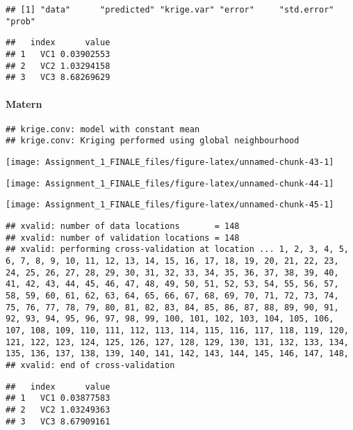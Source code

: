 \documentclass[
]{article}
\begin{document}
\begin{verbatim}
## [1] "data"      "predicted" "krige.var" "error"     "std.error" "prob"
\end{verbatim}

\begin{verbatim}
##   index      value
## 1   VC1 0.03902553
## 2   VC2 1.03294158
## 3   VC3 8.68269629
\end{verbatim}

\hypertarget{matern-1}{%
\paragraph{Matern}\label{matern-1}}

\begin{verbatim}
## krige.conv: model with constant mean
## krige.conv: Kriging performed using global neighbourhood
\end{verbatim}

\begin{center}\texttt{[image: Assignment\_1\_FINALE\_files/figure-latex/unnamed-chunk-43-1]} \end{center}

\begin{center}\texttt{[image: Assignment\_1\_FINALE\_files/figure-latex/unnamed-chunk-44-1]} \end{center}

\begin{center}\texttt{[image: Assignment\_1\_FINALE\_files/figure-latex/unnamed-chunk-45-1]} \end{center}

\begin{verbatim}
## xvalid: number of data locations       = 148
## xvalid: number of validation locations = 148
## xvalid: performing cross-validation at location ... 1, 2, 3, 4, 5, 6, 7, 8, 9, 10, 11, 12, 13, 14, 15, 16, 17, 18, 19, 20, 21, 22, 23, 24, 25, 26, 27, 28, 29, 30, 31, 32, 33, 34, 35, 36, 37, 38, 39, 40, 41, 42, 43, 44, 45, 46, 47, 48, 49, 50, 51, 52, 53, 54, 55, 56, 57, 58, 59, 60, 61, 62, 63, 64, 65, 66, 67, 68, 69, 70, 71, 72, 73, 74, 75, 76, 77, 78, 79, 80, 81, 82, 83, 84, 85, 86, 87, 88, 89, 90, 91, 92, 93, 94, 95, 96, 97, 98, 99, 100, 101, 102, 103, 104, 105, 106, 107, 108, 109, 110, 111, 112, 113, 114, 115, 116, 117, 118, 119, 120, 121, 122, 123, 124, 125, 126, 127, 128, 129, 130, 131, 132, 133, 134, 135, 136, 137, 138, 139, 140, 141, 142, 143, 144, 145, 146, 147, 148, 
## xvalid: end of cross-validation
\end{verbatim}

\begin{verbatim}
##   index      value
## 1   VC1 0.03877583
## 2   VC2 1.03249363
## 3   VC3 8.67909161
\end{verbatim}
\end{document}

